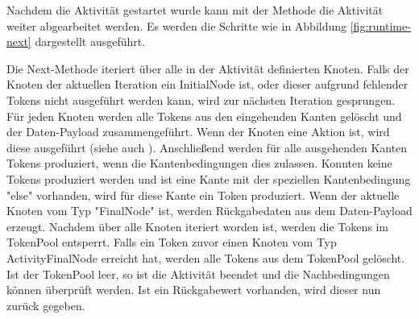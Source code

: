 Nachdem die Aktivität gestartet wurde kann mit der  Methode die Aktivität weiter abgearbeitet werden. Es werden die Schritte wie in Abbildung \ref{fig:runtime-next} dargestellt ausgeführt.


Die Next-Methode iteriert über alle in der Aktivität definierten Knoten. Falls der Knoten der aktuellen Iteration ein InitialNode ist, oder dieser aufgrund fehlender Tokens nicht ausgeführt werden kann, wird zur nächsten Iteration gesprungen. Für jeden Knoten werden alle Tokens aus den eingehenden Kanten gelöscht und der Daten-Payload zusammengeführt. Wenn der Knoten eine Aktion ist, wird diese ausgeführt (siehe auch ). Anschließend werden für alle ausgehenden Kanten Tokens produziert, wenn die Kantenbedingungen dies zulassen. Konnten keine Tokens produziert werden und ist eine Kante mit der speziellen Kantenbedingung "else" vorhanden, wird für diese Kante ein Token produziert. Wenn der aktuelle Knoten vom Typ "FinalNode" ist, werden Rückgabedaten aus dem Daten-Payload erzeugt. Nachdem über alle Knoten iteriert worden ist, werden die Tokens im TokenPool entsperrt. Falls ein Token zuvor einen Knoten vom Typ ActivityFinalNode erreicht hat, werden alle Tokens aus dem TokenPool gelöscht. Ist der TokenPool leer, so ist die Aktivität beendet und die Nachbedingungen können überprüft werden. Ist ein Rückgabewert vorhanden, wird dieser nun zurück gegeben.










